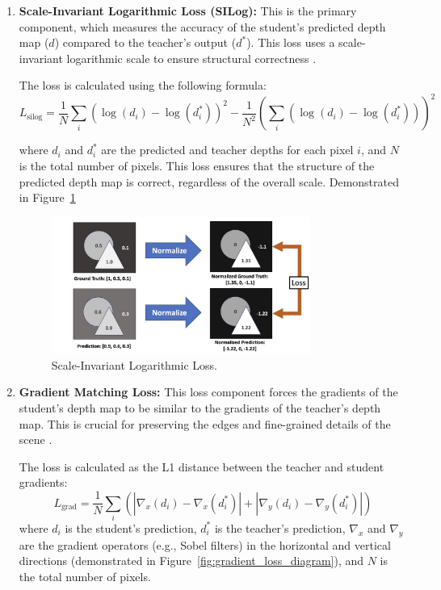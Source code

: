 \begin{enumerate}
    \item \textbf{Scale-Invariant Logarithmic Loss (SILog):} This is the primary component, which measures the accuracy of the student's predicted depth map ($d$) compared to the teacher's output ($d^*$). This loss uses a scale-invariant logarithmic scale to ensure structural correctness \cite{eigen2014depth}.
    
    The loss is calculated using the following formula:
    \begin{equation}
        L_{\text{silog}} = \frac{1}{N}\sum_{i} (\log(d_i) - \log(d_i^*))^2 - \frac{1}{N^2} (\sum_{i} (\log(d_i) - \log(d^*_i)))^2
        \label{eq:silog}
    \end{equation}
    
    where $d_i$ and $d_i^*$ are the predicted and teacher depths for each pixel $i$, and $N$ is the total number of pixels. This loss ensures that the structure of the predicted depth map is correct, regardless of the overall scale.  Demonstrated in Figure~\ref{fig:silog_diagram}

    \begin{figure}[htbp]
        \centering
        \includegraphics[width=0.8\textwidth]{images/silog_diagram.png}
        \caption{Scale-Invariant Logarithmic Loss.}
        \label{fig:silog_diagram}
    \end{figure}

    \item \textbf{Gradient Matching Loss:} This loss component forces the gradients of the student's depth map to be similar to the gradients of the teacher's depth map. This is crucial for preserving the edges and fine-grained details of the scene \cite{li2018megadepth}.
    
    The loss is calculated as the L1 distance between the teacher and student gradients:
    \begin{equation}
        L_{\text{grad}} = \frac{1}{N} \sum_i \left( |\nabla_x(d_i) - \nabla_x(d_i^*)| + |\nabla_y(d_i) - \nabla_y(d_i^*)| \right)
        \label{eq:grad_loss}
    \end{equation}
    where $d_i$ is the student's prediction, $d_i^*$ is the teacher's prediction, $\nabla_x$ and $\nabla_y$ are the gradient operators (e.g., Sobel filters) in the horizontal and vertical directions  (demonstrated in Figure~\ref{fig:gradient_loss_diagram}), and $N$ is the total number of pixels.


\end{enumerate}
